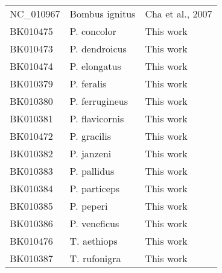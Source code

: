 \documentclass[../DISSERTACAO_MAIN.tex]{subfiles}
\begin{document}
\begin{table}
\begin{tabular}{|l|l|l|}
		NC\_010967       & Bombus 			ignitus           & Cha 			et al., 2007                     \\
		BK010475         & P. 			concolor              & This 			work                            \\
		BK010473         & P. 			dendroicus            & This 			work                            \\
		BK010474         & P. 			elongatus             & This 			work                            \\
		BK010379         & P. 			feralis               & This 			work                            \\
		BK010380         & P. 			ferrugineus           & This 			work                            \\
		BK010381         & P. 			flavicornis           & This 			work                            \\
		BK010472         & P. 			gracilis              & This 			work                            \\
		BK010382         & P. 			janzeni               & This 			work                            \\
		BK010383         & P. 			pallidus              & This 			work                            \\
		BK010384         & P. 			particeps             & This 			work                            \\
		BK010385         & P. 			peperi                & This 			work                            \\
		BK010386         & P. 			veneficus             & This 			work                            \\
		BK010476         & T. 			aethiops              & This 			work                            \\
		BK010387         & T. 			rufonigra             & This 			work \\
		\hline                          
	\end{tabular}
\end{table}	
	
\end{document}
